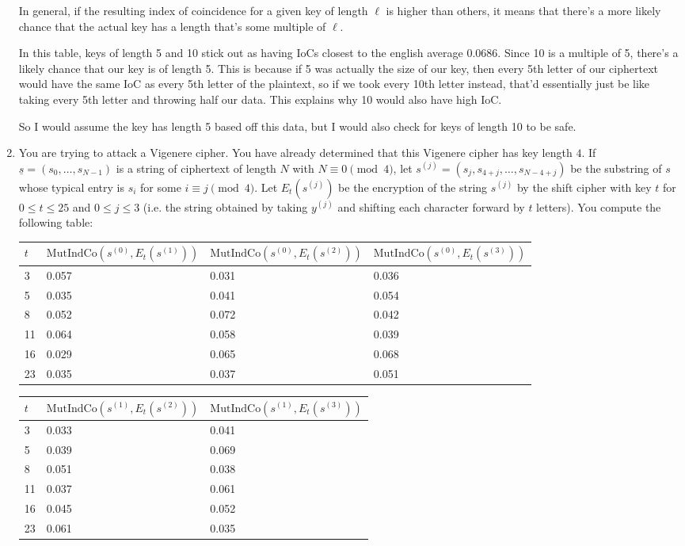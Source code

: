 \documentclass[11pt]{article}
\newcommand{\n}{\vspace{0.3cm}}
\begin{document}
\begin{enumerate}
In general, if the resulting index of coincidence for a given key of length \(\ell\) is higher than others, it means that there's a more likely chance that the actual key has a length that's some multiple of \(\ell\). \n

In this table, keys of length 5 and 10 stick out as having IoCs closest to the english average 0.0686.  Since 10 is a multiple of 5, there's a likely chance that our key is of length 5.  This is because if 5 was actually the size of our key, then every 5th letter of our ciphertext would have the same IoC as every 5th letter of the plaintext, so if we took every 10th letter instead, that'd essentially just be like taking every 5th letter and throwing half our data. This explains why 10 would also have high IoC. \n

So I would assume the key has length 5 based off this data, but I would also check for keys of length 10 to be safe.

\item   You are trying to attack a Vigenere cipher.  You have already determined that this Vigenere cipher has key length $4$.  If $\underline{s} = (s_0, \ldots, s_{N-1})$ is a string of ciphertext of length $N$ with $N \equiv 0 \pmod4$, let $s^{(j)} = (s_j,s_{4+j},\ldots,s_{N-4+j})$ be the substring of $s$ whose typical entry is $s_i$ for some $i \equiv j \pmod 4$.  Let $E_t(s^{(j)})$ be the encryption of the string $s^{(j)}$ by the shift cipher with key $t$ for $0 \leq t \leq 25$ and $0 \leq j \leq 3$ (i.e. the string obtained by taking $y^{(j)}$ and shifting each character forward by $t$ letters).  You compute the following table:

\begin{center}
    \begin{tabular}{ l | l | l | l }
    $t$ & $\mathrm{MutIndCo}(s^{(0)},E_t(s^{{(1)}}))$ & $\mathrm{MutIndCo}(s^{(0)},E_t(s^{{(2)}}))$  & $\mathrm{MutIndCo}(s^{(0)},E_t(s^{{(3)}}))$  \\ \hline
    3 & 0.057 & 0.031 & 0.036 \\     
    5 & 0.035 & 0.041 & 0.054 \\ 
    8& 0.052 & 0.072 & 0.042\\ 
    11 & 0.064 & 0.058 & 0.039\\ 
    16 & 0.029 & 0.065 & 0.068 \\ 
    23 & 0.035 & 0.037 & 0.051
    \end{tabular}
      \begin{tabular}{ l | l | l}
    $t$ & $\mathrm{MutIndCo}(s^{(1)},E_t(s^{{(2)}}))$ & $\mathrm{MutIndCo}(s^{(1)},E_t(s^{{(3)}}))$\\ \hline
    3 & 0.033 & 0.041 \\     
    5 & 0.039 & 0.069\\ 
    8 & 0.051 & 0.038\\ 
    11 & 0.037 & 0.061\\ 
    16 & 0.045 & 0.052\\ 
    23 & 0.061 & 0.035\\
    \end{tabular}
    \end{center} 
    

\end{enumerate}
\end{document}
